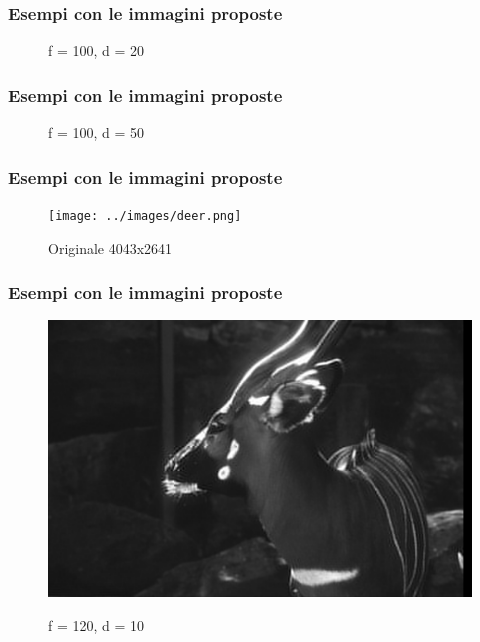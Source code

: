 \documentclass{beamer}
\begin{document}
\begin{frame}
	\frametitle{Esempi con le immagini proposte}
	\begin{figure}
		\caption{f = 100, d = 20}
	\end{figure}	
\end{frame}

\begin{frame}
	\frametitle{Esempi con le immagini proposte}
	\begin{figure}
		\caption{f = 100, d = 50}
	\end{figure}	
\end{frame}

\begin{frame}
	\frametitle{Esempi con le immagini proposte}
	\begin{figure}
		{\texttt{[image: ../images/deer.png]}}
		\caption{Originale 4043x2641}
	\end{figure}	
\end{frame}

\begin{frame}
	\frametitle{Esempi con le immagini proposte}
	\begin{figure}
		{\includegraphics[width=.8\linewidth]{../images/deer-compressed-120-10.png}}
		\caption{f = 120, d = 10}
	\end{figure}	
\end{frame}
\end{document}

